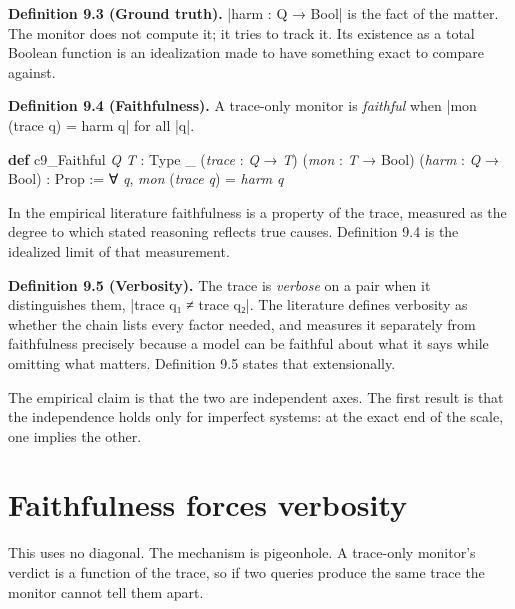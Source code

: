 \documentclass{memoir}
\begin{document}
\textbf{Definition 9.3 (Ground truth).} \LeanVerb|harm : Q → Bool| is the fact of the matter. The
monitor does not compute it; it tries to track it. Its existence as a total
Boolean function is an idealization made to have something exact to compare
against.

\textbf{Definition 9.4 (Faithfulness).} A trace-only monitor is \emph{faithful} when
\LeanVerb|mon (trace q) = harm q| for all \LeanVerb|q|.

\begin{LeanVerbatim}
\textbf{def} c9_Faithful \textit{Q} \textit{T} : Type _
    (\textit{trace} : \textit{Q} → \textit{T}) (\textit{mon} : \textit{T} → Bool)
    (\textit{harm} : \textit{Q} → Bool) : Prop :=
  ∀ \textit{q}, \textit{mon} (\textit{trace} \textit{q}) = \textit{harm} \textit{q}

\end{LeanVerbatim}


In the empirical literature faithfulness is a property of the trace, measured as
the degree to which stated reasoning reflects true causes. Definition 9.4 is the
idealized limit of that measurement.

\textbf{Definition 9.5 (Verbosity).} The trace is \emph{verbose} on a pair when it distinguishes
them, \LeanVerb|trace q₁ ≠ trace q₂|. The literature defines verbosity as whether the
chain lists every factor needed, and measures it separately from faithfulness
precisely because a model can be faithful about what it says while omitting what
matters. Definition 9.5 states that extensionally.

The empirical claim is that the two are independent axes. The first result is
that the independence holds only for imperfect systems: at the exact end of the
scale, one implies the other.



\section{Faithfulness forces verbosity}\label{Two--Schemas--of--Impossibility-005F-005F-005F--Machine--Checked--Limits--of--Trustworthy--Machine--Learning-005F-005F-005F--and--Why--They--Tighten--with--Capability----The--Trace--Is--Not--a--Window----Faithfulness--forces--verbosity}

This uses no diagonal. The mechanism is pigeonhole. A trace-only monitor's
verdict is a function of the trace, so if two queries produce the same trace the
monitor cannot tell them apart.
\end{document}
